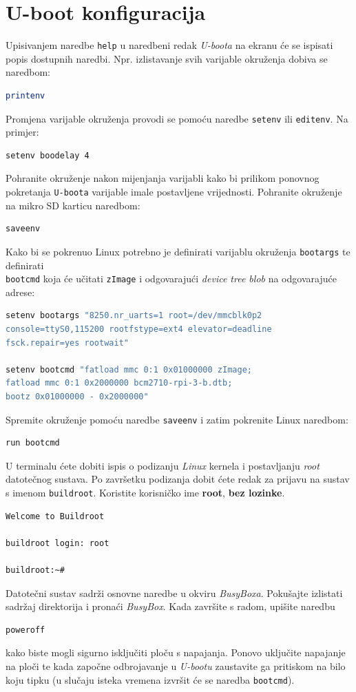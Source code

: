 \documentclass[11pt]{article}
\begin{document}
\section{U-boot konfiguracija}
Upisivanjem naredbe \texttt{help} u naredbeni redak \textit{U-boota} na ekranu
 će se ispisati popis dostupnih naredbi. Npr. izlistavanje svih varijable
 okruženja dobiva se naredbom:
\begin{lstlisting}[language=bash]
printenv
\end{lstlisting}
Promjena varijable okruženja provodi se pomoću naredbe \texttt{setenv} ili
 \texttt{editenv}. Na primjer:
\begin{lstlisting}[language=bash]
setenv boodelay 4
\end{lstlisting}
Pohranite okruženje nakon mijenjanja varijabli kako bi prilikom ponovnog
 pokretanja \texttt{U-boota} varijable imale postavljene vrijednosti. Pohranite
 okruženje na mikro SD karticu naredbom:
\begin{lstlisting}[language=bash]
saveenv
\end{lstlisting}
Kako bi se pokrenuo Linux potrebno je definirati varijablu okruženja
 \texttt{bootargs} te definirati\\ \texttt{bootcmd} koja će učitati
 \texttt{zImage} i odgovarajući \textit{device tree blob} na odgovarajuće adrese:
\begin{lstlisting}[language=bash]
setenv bootargs "8250.nr_uarts=1 root=/dev/mmcblk0p2
console=ttyS0,115200 rootfstype=ext4 elevator=deadline
fsck.repair=yes rootwait"

setenv bootcmd "fatload mmc 0:1 0x01000000 zImage;
fatload mmc 0:1 0x2000000 bcm2710-rpi-3-b.dtb;
bootz 0x01000000 - 0x2000000"
\end{lstlisting}
Spremite okruženje pomoću naredbe \texttt{saveenv} i zatim pokrenite Linux naredbom:
\begin{lstlisting}[language=bash]
run bootcmd
\end{lstlisting}
U terminalu ćete dobiti ispis o podizanju \textit{Linux} kernela i postavljanju
 \textit{root} datotečnog sustava. Po završetku podizanja dobit ćete redak za
 prijavu na sustav s imenom \texttt{buildroot}. Koristite korisničko ime
 \textbf{root}, \textbf{bez lozinke}.
\begin{lstlisting}[language=bash]
Welcome to Buildroot

buildroot login: root

buildroot:~#
\end{lstlisting}
Datotečni sustav sadrži osnovne naredbe u okviru \textit{BusyBoxa}. Pokušajte
 izlistati sadržaj direktorija i pronaći \textit{BusyBox}. Kada završite s
 radom, upišite naredbu
\begin{lstlisting}[language=bash]
poweroff
\end{lstlisting}
kako biste mogli sigurno isključiti ploču s napajanja. Ponovo uključite
 napajanje na ploči te kada započne odbrojavanje u \textit{U-bootu} zaustavite
 ga pritiskom na bilo koju tipku (u slučaju isteka vremena izvršit će se
 naredba \texttt{bootcmd}).
\end{document}
